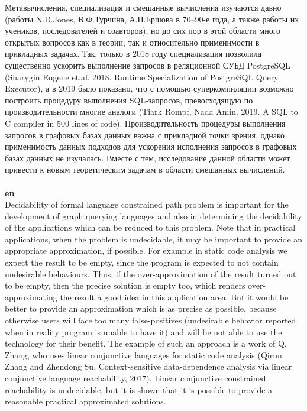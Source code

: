 \documentclass[12pt]{article}  %
\theoremstyle{remark}
\begin{document}
Метавычисления, специализация и смешанные вычисления изучаются давно (работы N.D.Jones, В.Ф.Турчина, А.П.Ершова в 70--90-е года, а также работы их учеников, последователей и соавторов), но до сих пор в этой области много открытых вопросов как в теории, так и относительно применимости в прикладных задачах.
Так, только в 2018 году специализация позволила существенно ускорить выполнение запросов в реляционной СУБД PostgreSQL (Sharygin Eugene et.al. 2018. Runtime Specialization of PostgreSQL Query Executor), а в 2019 было показано, что с помощью суперкомпиляции возможно построить процедуру выполнения SQL-запросов, превосходящую по производительности многие аналоги (Tiark Rompf, Nada Amin. 2019. A SQL to C compiler in 500 lines of code).
Производительность процедуры выполнения запросов в графовых базах данных важна с прикладной точки зрения, однако применимость данных подходов для ускорения исполнения запросов в графовых базах данных не изучалась.
Вместе с тем, исследование данной области может привести к новым теоретическим задачам в области смешанных вычислений.
\\
\\
\textbf{en}\\
Decidability of formal language constrained path problem is important for the development of graph querying languages and also in determining the decidability of the applications which can be reduced to this problem.
Note that in practical applications, when the problem is undecidable, it may be important to provide an appropriate approximation, if possible.
For example in static code analysis we expect the result to be empty, since the program is expected to not contain undesirable behaviours.
Thus, if the over-approximation of the result turned out to be empty, then the precise solution is empty too, which renders over-approximating the result a good idea in this application area.
But it would be better to provide an approximation which is as precise as possible, because otherwise users will face too many false-positives (undesirable behavior reported when in reality program is unable to have it) and will be not able to use the technology for their benefit.
The example of such an approach is a work of Q. Zhang, who uses linear conjunctive languages for static code analysis (Qirun Zhang and Zhendong Su, Context-sensitive data-dependence analysis via linear conjunctive language reachability, 2017).
Linear conjunctive constrained reachability is undecidable, but it is shown that it is possible to provide a reasonable practical approximated solutions.
\end{document}
